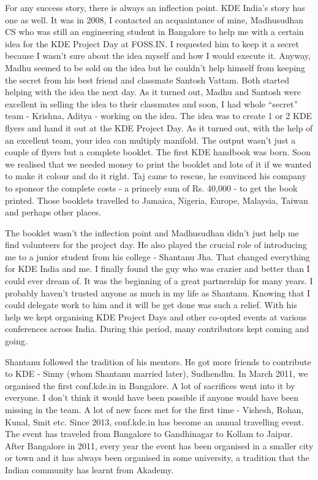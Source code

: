 For any success story, there is always an inflection point. KDE India's story has one as well. It was in 2008, I contacted an acquaintance of mine, Madhusudhan CS who was still an engineering student in Bangalore to help me with a certain idea for the KDE Project Day at FOSS.IN. I requested him to keep it a secret because I wasn't sure about the idea myself and how I would execute it. Anyway, Madhu seemed to be sold on the idea but he couldn't help himself from keeping the secret from his best friend and classmate Santosh Vattam. Both started helping with the idea the next day. As it turned out, Madhu and Santosh were excellent in selling the idea to their classmates and soon, I had whole “secret” team - Krishna, Aditya - working on the idea. The idea was to create 1 or 2 KDE flyers and hand it out at the KDE Project Day. As it turned out, with the help of an excellent team, your idea can multiply manifold. The output wasn't just a couple of flyers but a complete booklet. The first KDE handbook was born. Soon we realised that we needed money to print the booklet and lots of it if we wanted to make it colour and do it right. Taj came to rescue, he convinced his company to sponsor the complete costs - a princely sum of Rs. 40,000 - to get the book printed. Those booklets travelled to Jamaica, Nigeria, Europe, Malaysia, Taiwan and perhaps other places.

The booklet wasn't the inflection point and Madhusudhan didn't just help me find volunteers for the project day. He also played the crucial role of introducing me to a junior student from his college - Shantanu Jha. That changed everything for KDE India and me. I finally found the guy who was crazier and better than I could ever dream of. It was the beginning of a great partnership for many years. I probably haven't trusted anyone as much in my life as Shantanu. Knowing that I could delegate work to him and it will be get done was such a relief. With his help we kept organising KDE Project Days and other co-opted events at various conferences across India. During this period, many contributors kept coming and going.

Shantanu followed the tradition of his mentors. He got more friends to contribute to KDE - Sinny (whom Shantanu married later), Sudhendhu. In March 2011, we organised the first conf.kde.in in Bangalore. A lot of sacrifices went into it by everyone. I don't think it would have been possible if anyone would have been missing in the team. A lot of new faces met for the first time - Vishesh, Rohan, Kunal, Smit etc. Since 2013, conf.kde.in has become an annual travelling event. The event has traveled from Bangalore to Gandhinagar to Kollam to Jaipur. After Bangalore in 2011, every year the event has been organised in a smaller city or town and it has always been organised in some university, a tradition that the Indian community has learnt from Akademy.

